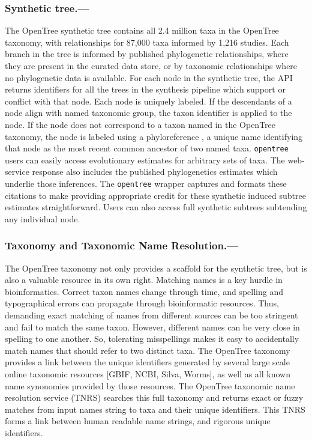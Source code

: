 \documentclass[oupdraft]{sysbio_sse}
\begin{document}
\subsubsection{Synthetic tree.---} The OpenTree synthetic tree contains all 2.4 million taxa in the OpenTree taxonomy, with relationships for 87,000 taxa informed by 1,216 studies.
Each branch in the tree is informed by published phylogenetic relationships, where they are present in the curated data store, or by taxonomic relationships where no phylogenetic data is available.
For each node in the synthetic tree, the API returns identifiers for
all the trees in the synthesis pipeline which support or conflict with that node.
Each node is uniquely labeled.
If the descendants of a node align with named taxonomic group, the taxon identifier is applied to the node.
If the node does not correspond to a taxon named in the OpenTree taxonomy, the node is labeled using a phyloreference \citep{parr_evolutionary_2012}, a unique name identifying that node as the most recent common ancestor of two named taxa.
\texttt{opentree} users can easily access evolutionary estimates for arbitrary sets of taxa.
The web-service response also includes the published phylogenetics estimates which underlie those inferences.
The \texttt{opentree} wrapper captures and formats these citations to make providing appropriate credit for these synthetic induced subtree estimates straightforward.
Users can also access full synthetic subtrees subtending any individual node.


\subsubsection{Taxonomy and Taxonomic Name Resolution.---} The OpenTree taxonomy not only provides a scaffold for the synthetic tree, but is also a valuable resource in its own right.
Matching names is a key hurdle in bioinformatics.
Correct taxon names change through time, and spelling and typographical errors can propagate through bioinformatic resources.
Thus, demanding exact matching of names from different sources can be too stringent and fail to match the same taxon.
However, different names can be very close in spelling to one another.
So, tolerating misspellings makes it easy to accidentally match names that should refer to two distinct taxa.
The OpenTree taxonomy \citep{rees_automated_2017, opentreeoflife_open_2019-1} provides a link between the unique identifiers generated by several large scale online taxonomic resources [GBIF, NCBI, Silva, Worms], as well as all known name synonomies provided by those resources.
The OpenTree taxonomic name resolution service (TNRS) searches this full taxonomy and returns exact or fuzzy matches from input names string to taxa and their unique identifiers.
This TNRS forms a link between human readable name strings, and rigorous unique identifiers.
\end{document}
